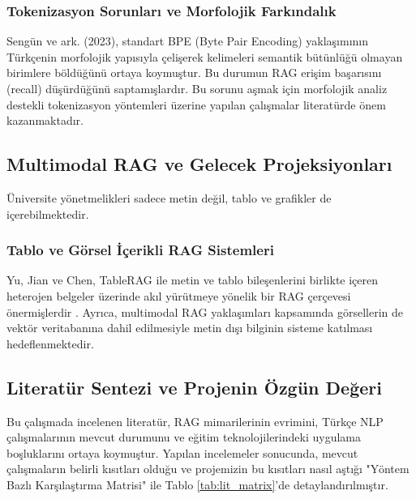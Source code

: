 \documentclass[12pt,a4paper]{report}
\begin{document}
\subsubsection{Tokenizasyon Sorunları ve Morfolojik Farkındalık}
Sengün ve ark. (2023), standart BPE (Byte Pair Encoding) yaklaşımının Türkçenin morfolojik yapısıyla çelişerek kelimeleri semantik bütünlüğü olmayan birimlere böldüğünü ortaya koymuştur. Bu durumun RAG erişim başarısını (recall) düşürdüğünü saptamışlardır. Bu sorunu aşmak için morfolojik analiz destekli tokenizasyon yöntemleri üzerine yapılan çalışmalar literatürde önem kazanmaktadır.

\subsection{Multimodal RAG ve Gelecek Projeksiyonları}
Üniversite yönetmelikleri sadece metin değil, tablo ve grafikler de içerebilmektedir. 

\subsubsection{Tablo ve Görsel İçerikli RAG Sistemleri}
Yu, Jian ve Chen, TableRAG ile metin ve tablo bileşenlerini birlikte içeren heterojen belgeler üzerinde akıl yürütmeye yönelik bir RAG çerçevesi önermişlerdir \cite{yu2024tablerag}. Ayrıca, multimodal RAG yaklaşımları kapsamında görsellerin de vektör veritabanına dahil edilmesiyle metin dışı bilginin sisteme katılması hedeflenmektedir.

\subsection{Literatür Sentezi ve Projenin Özgün Değeri}
Bu çalışmada incelenen literatür, RAG mimarilerinin evrimini, Türkçe NLP çalışmalarının mevcut durumunu ve eğitim teknolojilerindeki uygulama boşluklarını ortaya koymuştur. Yapılan incelemeler sonucunda, mevcut çalışmaların belirli kısıtları olduğu ve projemizin bu kısıtları nasıl aştığı "Yöntem Bazlı Karşılaştırma Matrisi" ile Tablo \ref{tab:lit_matrix}'de detaylandırılmıştır.
\end{document}
